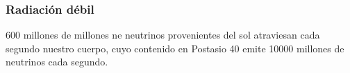 \documentclass[%
xcolor=pdftex,dvipsnames,table%
]{beamer}
\begin{document}
\begin{frame}
  \frametitle{Radiación débil}
  600 millones de millones ne neutrinos provenientes del sol atraviesan cada segundo nuestro cuerpo, cuyo contenido en Postasio 40 emite 10000 millones de neutrinos cada segundo.
\end{frame}
{
\begin{frame}[plain]
\end{frame}
}
{
\begin{frame}[plain]
\end{frame}
}
\end{document}
